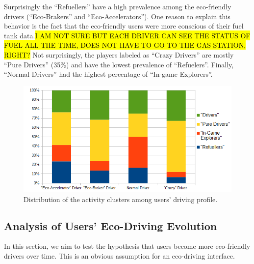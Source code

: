 \documentclass[preprint,authoryear,12pt]{elsarticle}
\begin{document}

Surprisingly the ``Refuellers'' have a high prevalence among the eco-friendly drivers (``Eco-Brakers'' and ``Eco-Accelerators''). One reason to explain this behavior is the fact that the eco-friendly users were more conscious of their fuel tank data.\hl{I AM NOT SURE BUT EACH DRIVER CAN SEE THE STATUS OF FUEL ALL THE TIME, DOES NOT HAVE TO GO TO THE GAS STATION, RIGHT?}
Not surprisingly, the players labeled as ``Crazy Drivers'' are mostly ``Pure Drivers'' (35\%) and have the lowest prevalence of ``Refuelers''.
Finally, ``Normal Drivers'' had the highest percentage of ``In-game Explorers''.


\begin{figure}[htb]
	\begin{center}
		\includegraphics[width=.8\linewidth]{ijhcs14-img/cluster_activities_driver_types}
		\caption{Distribution of the activity clusters among users' driving profile.\label{fig:activity_driving}}
	\end{center}
\end{figure}


\subsection{Analysis of Users' Eco-Driving Evolution}
\label{subsec:eco-friendliness_over_time}

In this section, we aim to test the hypothesis that users become more eco-friendly drivers over time. This is an obvious assumption for an eco-driving interface.
\end{document}
